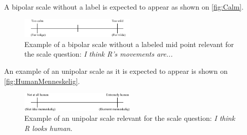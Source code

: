 \noindent
% 
A bipolar scale without a label is expected to appear as shown on \autoref{fig:Calm}.  
%
\begin{figure}[H]
\centering
\includegraphics[width = 0.49\textwidth]{Figure/CalmWild} 
\caption{Example of a bipolar scale without a labeled mid point relevant for the scale question: \textit{I think R's movements are...}}
\label{fig:Calm}
\end{figure}
\noindent
%
An example of an unipolar scale as it is expected to appear is shown on \autoref{fig:HumanMenneskelig}.
%
\begin{figure}[H]
\centering
\includegraphics[width = 0.49\textwidth]{Figure/HumanMenneskelig} 
\caption{Example of an unipolar scale relevant for the scale question: \textit{I think R looks human}.}
\label{fig:HumanMenneskelig}
\end{figure}
\noindent
%

